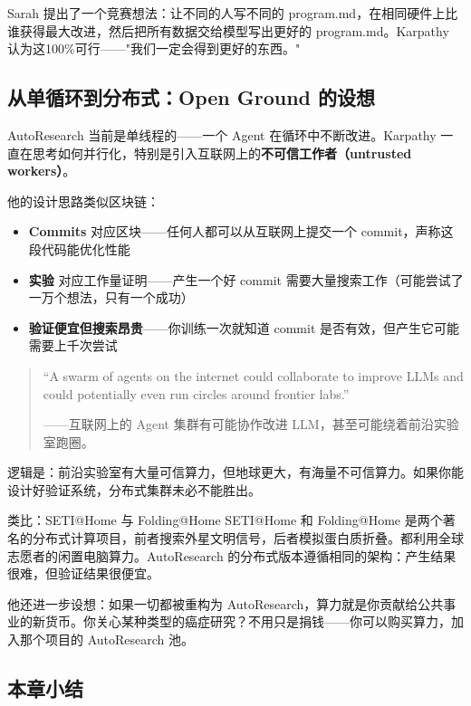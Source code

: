\documentclass[a4paper]{article}
\begin{document}
Sarah 提出了一个竞赛想法：让不同的人写不同的 program.md，在相同硬件上比谁获得最大改进，然后把所有数据交给模型写出更好的 program.md。Karpathy 认为这100\%可行——"我们一定会得到更好的东西。"

\subsection{从单循环到分布式：Open Ground 的设想}

AutoResearch 当前是单线程的——一个 Agent 在循环中不断改进。Karpathy 一直在思考如何并行化，特别是引入互联网上的\textbf{不可信工作者（untrusted workers）}。

他的设计思路类似区块链：
\begin{itemize}
    \item \textbf{Commits} 对应区块——任何人都可以从互联网上提交一个 commit，声称这段代码能优化性能
    \item \textbf{实验} 对应工作量证明——产生一个好 commit 需要大量搜索工作（可能尝试了一万个想法，只有一个成功）
    \item \textbf{验证便宜但搜索昂贵}——你训练一次就知道 commit 是否有效，但产生它可能需要上千次尝试
\end{itemize}

\begin{quote}
``A swarm of agents on the internet could collaborate to improve LLMs and could potentially even run circles around frontier labs.''

——互联网上的 Agent 集群有可能协作改进 LLM，甚至可能绕着前沿实验室跑圈。
\end{quote}

逻辑是：前沿实验室有大量可信算力，但地球更大，有海量不可信算力。如果你能设计好验证系统，分布式集群未必不能胜出。

\begin{knowledgebox}{类比：SETI@Home 与 Folding@Home}
SETI@Home 和 Folding@Home 是两个著名的分布式计算项目，前者搜索外星文明信号，后者模拟蛋白质折叠。都利用全球志愿者的闲置电脑算力。AutoResearch 的分布式版本遵循相同的架构：产生结果很难，但验证结果很便宜。
\end{knowledgebox}

他还进一步设想：如果一切都被重构为 AutoResearch，算力就是你贡献给公共事业的新货币。你关心某种类型的癌症研究？不用只是捐钱——你可以购买算力，加入那个项目的 AutoResearch 池。

\subsection{本章小结}
\end{document}
